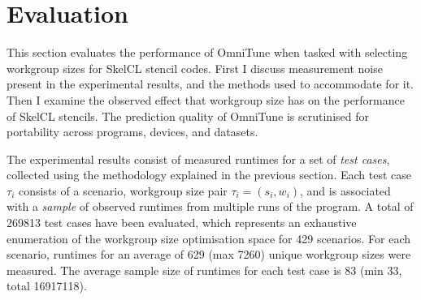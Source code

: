 \documentclass[nonatbib,preprint,9pt]{sigplanconf}
\begin{document}
\section{Evaluation}\label{sec:evaluation}

This section evaluates the performance of OmniTune when tasked with
selecting workgroup sizes for SkelCL stencil codes. First I discuss
measurement noise present in the experimental results, and the methods
used to accommodate for it. Then I examine the observed effect that
workgroup size has on the performance of SkelCL stencils. The
prediction quality of OmniTune is scrutinised for portability across
programs, devices, and datasets.



The experimental results consist of measured runtimes for a set of
\emph{test cases}, collected using the methodology explained in the
previous section. Each test case $\tau_i$ consists of a scenario,
workgroup size pair $\tau_i = (s_i,w_i)$, and is associated with a
\emph{sample} of observed runtimes from multiple runs of the
program. A total of 269813 test cases have been evaluated, which
represents an exhaustive enumeration of the workgroup size
optimisation space for 429 scenarios. For each scenario, runtimes for
an average of 629 (max 7260) unique workgroup sizes were measured. The
average sample size of runtimes for each test case is 83 (min 33,
total 16917118).


\end{document}
